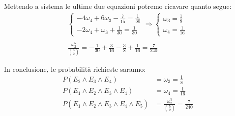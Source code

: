Mettendo a sistema le ultime due equazioni potremo ricavare quanto segue:
\begin{align*}
\begin{cases} 
-4\omega_4+6\omega_3-\frac{7}{15}= \frac{1}{30} \\
-2\omega_4+\omega_3+\frac{1}{30} = \frac{1}{30} 
\end{cases}
\Longrightarrow
\begin{cases} 
\omega_3 = \frac{1}{8}\\
\omega_4 = \frac{1}{16}
\end{cases}\\ \\
\frac{\omega_2^5}{\binom{5}{2}} = -\frac{1}{30}+\frac{3}{16}-\frac{3}{8}+\frac{1}{16} = \frac{7}{240}
\end{align*}

In conclusione, le probabilità richieste saranno:
\begin{align*}
	 P(E_2\wedge E_3\wedge E_4) &= \omega_3 = \frac{1}{8}\\
	 P(E_1\wedge E_2\wedge E_3\wedge E_4)&= \omega_4 = \frac{1}{16}\\
	 P(E_1\wedge E_2\wedge\overline{E}_3\wedge\overline{E}_4\wedge\overline{E}_5) &= \frac{\omega_2^5}{\binom{5}{2}} = \frac{7}{240}
\end{align*}

